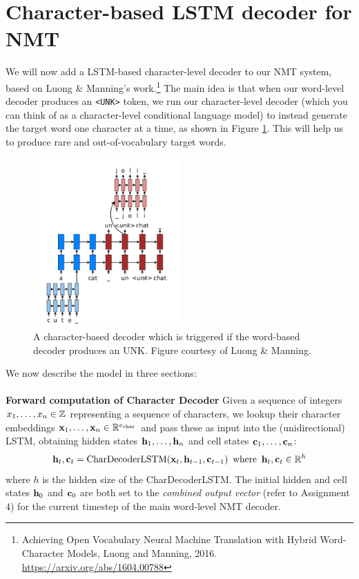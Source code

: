 \section{Character-based LSTM decoder for NMT}
\label{sec:char_dec}
We will now add a LSTM-based character-level decoder to our NMT system, based on Luong \& Manning's work.\footnote{Achieving Open Vocabulary Neural Machine Translation with Hybrid Word-Character Models, Luong and Manning, 2016. \url{https://arxiv.org/abs/1604.00788}}
The main idea is that when our word-level decoder produces an \texttt{<UNK>} token, we run our character-level decoder (which you can think of as a character-level conditional language model) to instead generate the target word one character at a time, as shown in Figure \ref{fig:char-decoder}. 
This will help us to produce rare and out-of-vocabulary target words.

\begin{figure}[h!]
    \begin{center}
        \captionsetup{width=0.8\textwidth}
        \includegraphics[width=0.5\textwidth]{images/char-decoder.PNG}
        \caption{A character-based decoder which is triggered if the word-based decoder produces an UNK. Figure courtesy of Luong \& Manning.}
        \label{fig:char-decoder}
    \end{center}
\end{figure}

We now describe the model in three sections:\\~\\
\textbf{Forward computation of Character Decoder}
Given a sequence of integers $x_1,\dots,x_n \in \mathbb{Z}$ representing a sequence of characters, we lookup their character embeddings $\mathbf{x}_1,\dots,\mathbf{x}_n \in \mathbb{R}^{e_\text{char}}$ and pass these as input into the (unidirectional) LSTM, obtaining hidden states $\mathbf{h}_1,\dots,\mathbf{h}_n$ and cell states $\mathbf{c}_1,\dots,\mathbf{c}_n$:
\begin{equation}
    \mathbf{h}_t, \mathbf{c}_t = \text{CharDecoderLSTM}(\mathbf{x}_t, \mathbf{h}_{t-1}, \mathbf{c}_{t-1}) \enspace \text{where} \enspace \mathbf{h}_t, \mathbf{c}_t \in \mathbb{R}^h
\end{equation}
where $h$ is the hidden size of the CharDecoderLSTM.
The initial hidden and cell states $\mathbf{h}_0$ and $\mathbf{c}_0$ are both set to %
the \textit{combined output vector} (refer to Assignment 4) for the current timestep of the main word-level NMT decoder.

